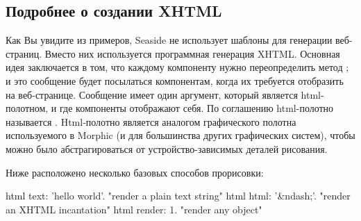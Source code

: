\documentclass[a4paper,10pt,twoside]{book}
\begin{document}
\subsection{Подробнее о создании XHTML}


Как Вы увидите из примеров, Seaside не использует шаблоны для генерации веб-страниц.
Вместо них используется программная генерация XHTML.
Основная идея заключается в том,
что каждому компоненту нужно переопределить метод
;
и это сообщение будет посылаться компонентам,
когда их требуется отобразить на веб-странице.
Сообщение  имеет один аргумент,
который является   html-полотном,
и где компоненты отображают себя.
По соглашению html-полотно называется .
Html-полотно является аналогом графического полотна используемого в Morphic
(и для большинства других графических систем),
чтобы можно было абстрагироваться от устройство-зависимых
деталей рисования.

Ниже расположено несколько базовых способов прорисовки:
\begin{code}{}
html text: 'hello world'.  "render a plain text string"
html html: '&ndash;'.     "render an XHTML incantation"
html render: 1.              "render any object"
\end{code}

\end{document}
